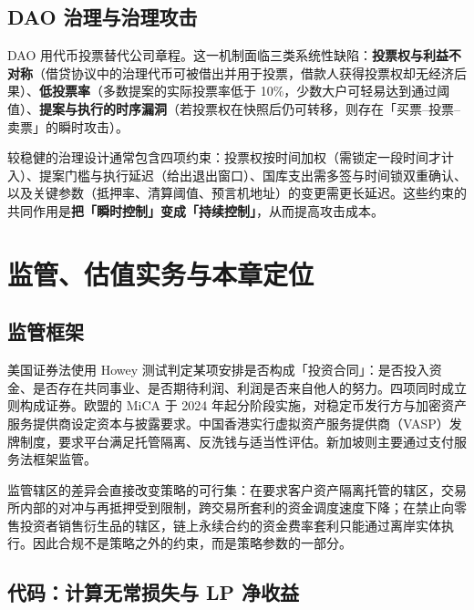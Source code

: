 \subsection{DAO 治理与治理攻击}

DAO 用代币投票替代公司章程。这一机制面临三类系统性缺陷：\textbf{投票权与利益不对称}（借贷协议中的治理代币可被借出并用于投票，借款人获得投票权却无经济后果）、\textbf{低投票率}（多数提案的实际投票率低于 10\%，少数大户可轻易达到通过阈值）、\textbf{提案与执行的时序漏洞}（若投票权在快照后仍可转移，则存在「买票--投票--卖票」的瞬时攻击）。

\begin{appbox}[治理设计的工程约束]
较稳健的治理设计通常包含四项约束：投票权按时间加权（需锁定一段时间才计入）、提案门槛与执行延迟（给出退出窗口）、国库支出需多签与时间锁双重确认、以及关键参数（抵押率、清算阈值、预言机地址）的变更需更长延迟。这些约束的共同作用是\textbf{把「瞬时控制」变成「持续控制」}，从而提高攻击成本。
\end{appbox}

\section{监管、估值实务与本章定位}

\subsection{监管框架}

美国证券法使用 Howey 测试判定某项安排是否构成「投资合同」：是否投入资金、是否存在共同事业、是否期待利润、利润是否来自他人的努力。四项同时成立则构成证券。欧盟的 MiCA 于 2024 年起分阶段实施，对稳定币发行方与加密资产服务提供商设定资本与披露要求。中国香港实行虚拟资产服务提供商（VASP）发牌制度，要求平台满足托管隔离、反洗钱与适当性评估。新加坡则主要通过支付服务法框架监管。

\begin{notebox}[监管差异对量化策略的实际影响]
监管辖区的差异会直接改变策略的可行集：在要求客户资产隔离托管的辖区，交易所内部的对冲与再抵押受到限制，跨交易所套利的资金调度速度下降；在禁止向零售投资者销售衍生品的辖区，链上永续合约的资金费率套利只能通过离岸实体执行。因此合规不是策略之外的约束，而是策略参数的一部分。
\end{notebox}

\subsection{代码：计算无常损失与 LP 净收益}


